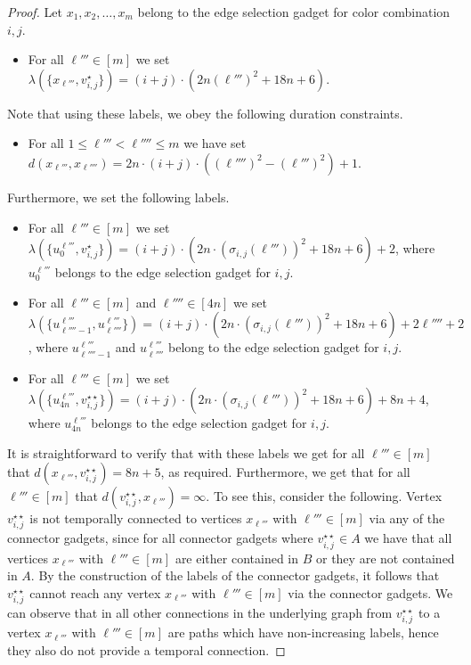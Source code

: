 \documentclass[a4paper,UKenglish,cleveref, autoref, thm-restate, anonymous]{lipics-v2021}
\begin{document}
\begin{proof}
Let $x_1, x_2, \ldots, x_m$ belong to the edge selection gadget for color combination $i,j$.
\begin{itemize}
    \item For all $\ell'''\in[m]$ we set $\lambda(\{x_{\ell'''},v_{i,j}^{\star}\})=(i+j)\cdot (2n({\ell'''})^2 +18n+6)$.
\end{itemize}
Note that using these labels, we obey the following duration constraints.
\begin{itemize}
    \item For all $1\le \ell'''<\ell''''\le m$ we have set $d(x_{\ell'''},x_{\ell''''})=2n\cdot (i+j)\cdot((\ell'''')^2-(\ell''')^2)+1$.
\end{itemize}
Furthermore, we set the following labels.
\begin{itemize}
    \item  For all $\ell'''\in[m]$ we set $\lambda(\{u^{\ell'''}_{0},v_{i,j}^{\star}\})=(i+j)\cdot (2n\cdot (\sigma_{i,j}(\ell'''))^2 +18n+6)+2$, where $u^{\ell'''}_{0}$ belongs to the edge selection gadget for $i,j$.
    \item For all $\ell'''\in[m]$ and $\ell''''\in[4n]$ we set $\lambda(\{u^{\ell'''}_{\ell''''-1},u^{\ell'''}_{\ell''''}\})=(i+j)\cdot (2n\cdot (\sigma_{i,j}(\ell'''))^2 +18n+6)+2\ell''''+2$, where $u^{\ell'''}_{\ell''''-1}$ and $u^{\ell'''}_{\ell''''}$ belong to the edge selection gadget for $i,j$.
    \item  For all $\ell'''\in[m]$ we set $\lambda(\{u^{\ell'''}_{4n},v_{i,j}^{\star\star}\})=(i+j)\cdot (2n\cdot (\sigma_{i,j}(\ell'''))^2 +18n+6)+8n+4$, where $u^{\ell'''}_{4n}$ belongs to the edge selection gadget for $i,j$.
\end{itemize}

It is straightforward to verify that with these labels we get for all $\ell'''\in[m]$ that $d(x_{\ell'''},v_{i,j}^{\star\star})=8n+5$, as required.
Furthermore, we get that for all $\ell'''\in[m]$ that $d(v_{i,j}^{\star\star},x_{\ell'''})=\infty$. To see this, consider the following. Vertex $v_{i,j}^{\star\star}$ is not temporally connected to vertices $x_{\ell'''}$ with $\ell'''\in[m]$ via any of the connector gadgets, since for all connector gadgets where $v_{i,j}^{\star\star}\in A$ we have that all vertices $x_{\ell'''}$ with $\ell'''\in[m]$ are either contained in $B$ or they are not contained in $A$. By the construction of the labels of the connector gadgets, it follows that $v_{i,j}^{\star\star}$ cannot reach any vertex $x_{\ell'''}$ with $\ell'''\in[m]$ via the connector gadgets.
We can observe that in all other connections in the underlying graph from $v_{i,j}^{\star\star}$ to a vertex $x_{\ell'''}$ with $\ell'''\in[m]$ are paths which have non-increasing labels, hence they also do not provide a temporal connection.


\end{proof}
\end{document}
